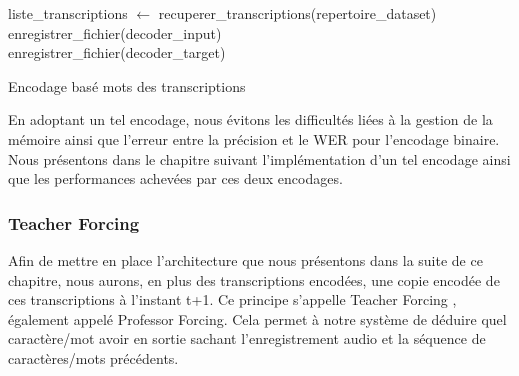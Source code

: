 \begin{algorithm2e}[H]
\SetAlgoLined
{} 
\BlankLine
liste\_transcriptions $\gets$ recuperer\_transcriptions(repertoire\_dataset) \\
enregistrer\_fichier(decoder\_input) \\
enregistrer\_fichier(decoder\_target) 
\caption{Encodage basé mots des transcriptions \label{algo3}}
\label{enc_mot}
\end{algorithm2e}

En adoptant un tel encodage, nous évitons les difficultés liées à la gestion de la mémoire ainsi que l'erreur entre la précision et le WER pour l'encodage binaire. Nous présentons dans le chapitre suivant l'implémentation d'un tel encodage ainsi que les performances achevées par ces deux encodages. 

\subsubsection{Teacher Forcing}
Afin de mettre en place l'architecture que nous présentons dans la suite de ce chapitre, nous aurons, en plus des transcriptions encodées, une copie encodée de ces transcriptions à l'instant t+1. Ce principe s'appelle Teacher Forcing \cite{teacherforcing}, également appelé Professor Forcing. Cela permet à notre système de déduire quel caractère/mot avoir en sortie sachant  l'enregistrement audio et la séquence de caractères/mots précédents.

